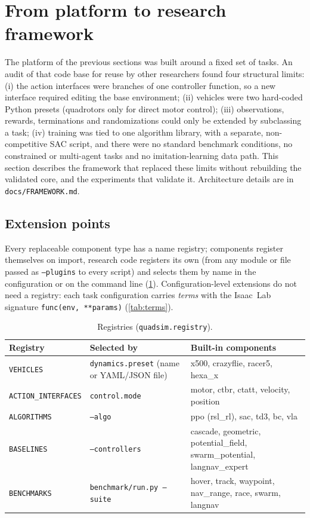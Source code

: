 \section{From platform to research framework}\label{sec:framework}
The platform of the previous sections was built around a fixed set of tasks. An audit of that code base for
reuse by other researchers found four structural limits: (i) the action interfaces were branches of one controller
function, so a new interface required editing the base environment; (ii) vehicles were two hard-coded Python presets
(quadrotors only for direct motor control); (iii) observations, rewards, terminations and randomizations could only be
extended by subclassing a task; (iv) training was tied to one algorithm library, with a separate, non-competitive SAC
script, and there were no standard benchmark conditions, no constrained or multi-agent tasks and no
imitation-learning data path. This section describes the framework that replaced these limits without rebuilding the
validated core, and the experiments that validate it. Architecture details are in \texttt{docs/FRAMEWORK.md}.

\subsection{Extension points}
Every replaceable component type has a name registry; components register themselves on import, research code
registers its own (from any module or file passed as \texttt{--plugins} to every script) and selects them by name in
the configuration or on the command line (\cref{tab:ext}). Configuration-level extensions do not need a registry:
each task configuration carries \emph{terms} with the Isaac~Lab signature \texttt{func(env, **params)}
(\cref{tab:terms}).

\begin{table}[!htbp]\centering\small
\caption{Registries (\texttt{quadsim.registry}).}\label{tab:ext}
\begin{tabularx}{\linewidth}{lXX}\toprule
Registry & Selected by & Built-in components\\\midrule
\texttt{VEHICLES} & \texttt{dynamics.preset} (name or YAML/JSON file) & x500, crazyflie, racer5, hexa\_x\\
\texttt{ACTION\_INTERFACES} & \texttt{control.mode} & motor, ctbr, ctatt, velocity, position\\
\texttt{ALGORITHMS} & \texttt{--algo} & ppo (rsl\_rl), sac, td3, bc, vla\\
\texttt{BASELINES} & \texttt{--controllers} & cascade, geometric, potential\_field, swarm\_potential, langnav\_expert\\
\texttt{BENCHMARKS} & \texttt{benchmark/run.py --suite} & hover, track, waypoint, nav\_range, race, swarm, langnav\\
\bottomrule\end{tabularx}
\end{table}

